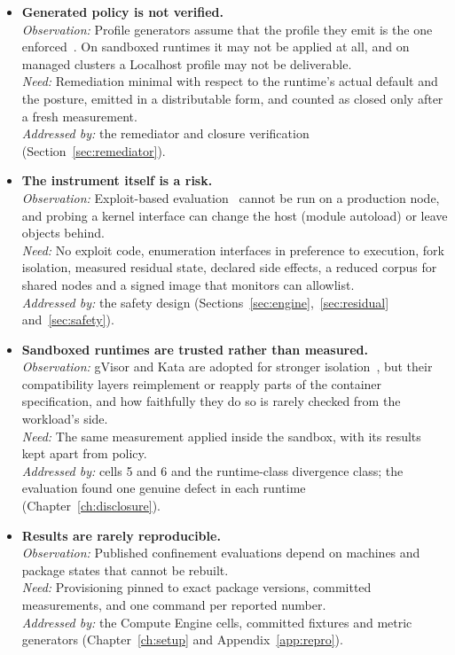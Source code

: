 \begin{itemize}[leftmargin=*,itemsep=5pt]
\item \textbf{Generated policy is not verified.}\\
\textit{Observation:} Profile generators assume that the profile they emit is the one enforced~\cite{confine2023,chestnut,c2c}. On sandboxed runtimes it may not be applied at all, and on managed clusters a Localhost profile may not be deliverable.\\
\textit{Need:} Remediation minimal with respect to the runtime's actual default and the posture, emitted in a distributable form, and counted as closed only after a fresh measurement.\\
\textit{Addressed by:} the remediator and closure verification (Section~\ref{sec:remediator}).

\item \textbf{The instrument itself is a risk.}\\
\textit{Observation:} Exploit-based evaluation~\cite{lin2018} cannot be run on a production node, and probing a kernel interface can change the host (module autoload) or leave objects behind.\\
\textit{Need:} No exploit code, enumeration interfaces in preference to execution, fork isolation, measured residual state, declared side effects, a reduced corpus for shared nodes and a signed image that monitors can allowlist.\\
\textit{Addressed by:} the safety design (Sections~\ref{sec:engine},~\ref{sec:residual} and~\ref{sec:safety}).

\item \textbf{Sandboxed runtimes are trusted rather than measured.}\\
\textit{Observation:} gVisor and Kata are adopted for stronger isolation~\cite{young2019gvisor,anjali2020blending,firecracker}, but their compatibility layers reimplement or reapply parts of the container specification, and how faithfully they do so is rarely checked from the workload's side.\\
\textit{Need:} The same measurement applied inside the sandbox, with its results kept apart from policy.\\
\textit{Addressed by:} cells 5 and 6 and the runtime-class divergence class; the evaluation found one genuine defect in each runtime (Chapter~\ref{ch:disclosure}).

\item \textbf{Results are rarely reproducible.}\\
\textit{Observation:} Published confinement evaluations depend on machines and package states that cannot be rebuilt.\\
\textit{Need:} Provisioning pinned to exact package versions, committed measurements, and one command per reported number.\\
\textit{Addressed by:} the Compute Engine cells, committed fixtures and metric generators (Chapter~\ref{ch:setup} and Appendix~\ref{app:repro}).
\end{itemize}
